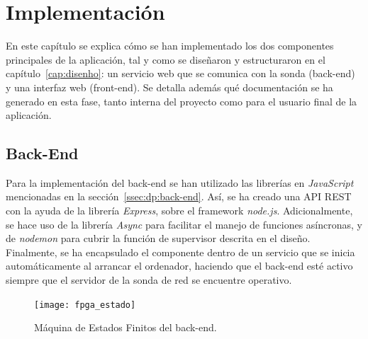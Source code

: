 \chapter{Implementación\label{cap:implementacion}}

En este capítulo se explica cómo se han implementado los dos componentes principales de la aplicación, tal y como se diseñaron y estructuraron en el capítulo~\ref{cap:disenho}: un servicio web que se comunica con la sonda (\gls{back-end}) y una interfaz web (\gls{front-end}).
Se detalla además qué documentación se ha generado en esta fase, tanto interna del proyecto como para el usuario final de la aplicación.

\section{Back-End\label{sec:imp:back_end}}

Para la implementación del \gls{back-end} se han utilizado las librerías en \textit{JavaScript} mencionadas en la sección~\ref{ssec:dp:back-end}.
Así, se ha creado una \gls{API} \gls{REST} con la ayuda de la librería \textit{Express}, sobre el \gls{framework} \textit{node.js}.
Adicionalmente, se hace uso de la librería \textit{Async} para facilitar el manejo de funciones asíncronas, y de \textit{nodemon} para cubrir la función de supervisor descrita en el diseño.
Finalmente, se ha encapsulado el componente dentro de un servicio que se inicia automáticamente al arrancar el ordenador, haciendo que el \gls{back-end} esté activo siempre que el servidor de la sonda de red se encuentre operativo.

\begin{figure}[!htp]
  \centering
  \texttt{[image: fpga\_estado]}
  \caption{Máquina de Estados Finitos del \gls{back-end}.}
  \label{fig:fpga_estado}
\end{figure}


